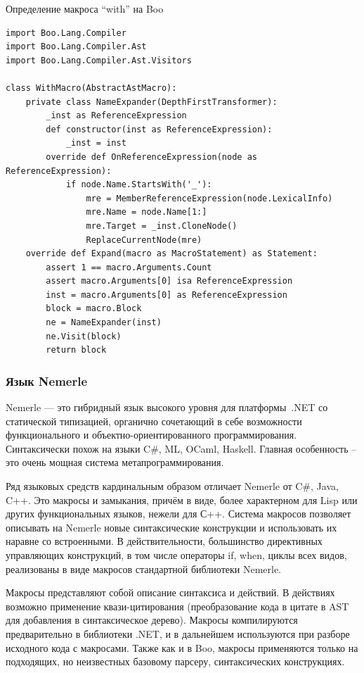 \documentclass[a4paper,12pt,titlepage]{extarticle}
\begin{document}
Определение макроса ``with'' на Boo
\begin{verbatim}
import Boo.Lang.Compiler
import Boo.Lang.Compiler.Ast
import Boo.Lang.Compiler.Ast.Visitors

class WithMacro(AbstractAstMacro):
    private class NameExpander(DepthFirstTransformer):
        _inst as ReferenceExpression
        def constructor(inst as ReferenceExpression):
            _inst = inst
        override def OnReferenceExpression(node as ReferenceExpression):
            if node.Name.StartsWith('_'):
                mre = MemberReferenceExpression(node.LexicalInfo)
                mre.Name = node.Name[1:]
                mre.Target = _inst.CloneNode()
                ReplaceCurrentNode(mre)
    override def Expand(macro as MacroStatement) as Statement:
        assert 1 == macro.Arguments.Count
        assert macro.Arguments[0] isa ReferenceExpression
        inst = macro.Arguments[0] as ReferenceExpression
        block = macro.Block
        ne = NameExpander(inst)
        ne.Visit(block)
        return block
\end{verbatim}

\subsubsection*{Язык Nemerle}
Nemerle — это гибридный язык высокого уровня для платформы~.NET со статической
типизацией, органично сочетающий в себе возможности функционального и
объектно-ориентированного программирования. Синтаксически похож на языки C\#,
ML, OCaml, Haskell. Главная особенность -- это очень мощная система
метапрограммирования.

Ряд языковых средств кардинальным образом отличает Nemerle от C\#, Java, C++.
Это макросы и замыкания, причём в виде, более характерном для Lisp или других
функциональных языков, нежели для С++. Система макросов позволяет описывать на
Nemerle новые синтаксические конструкции и использовать их наравне со
встроенными. В действительности, большинство директивных управляющих
конструкций, в том числе операторы if, when, циклы всех видов, реализованы в
виде макросов стандартной библиотеки Nemerle.

Макросы представляют собой описание синтаксиса и действий. В действиях
возможно применение квази-цитирования (преобразование кода в цитате в AST для
добавления в синтаксическое дерево). Макросы компилируются предварительно в
библиотеки .NET, и в дальнейшем используются при разборе исходного кода с
макросами. Также как и в Boo, макросы применяются только на подходящих, но
неизвестных базовому парсеру, синтаксических конструкциях.
\end{document}
